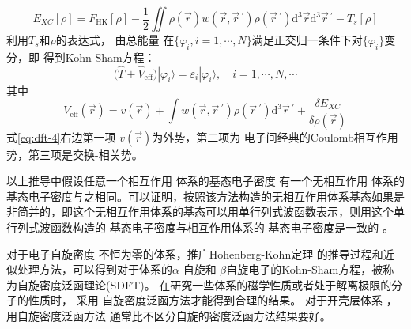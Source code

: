 \begin{equation} 
  \label{eq:dft-2}
  E_{XC}[\rho]=F_{\mathrm{HK}}[\rho]-\frac 12\iint{\rho(\vec{r}) w(\vec{r},\vec r\,^{\prime})\rho(\vec r\,^{\prime})\textrm{d}^3\vec{r}\textrm{d}^3\vec r\,^{\prime}}-T_{s}[\rho]
\end{equation}
利用$T_s$和$\rho$的表达式，%
{由}总能量%
{在$\{\varphi_i, i\!=\!1,\cdots, N\}$满足正交归一条件下对$\{\varphi_i\}$}变分，即%
得到Kohn-Sham方程：
\begin{equation} \label{eq:dft-3}
	\bigl(\hat{T}+\hat{V}_{\mathrm{eff}}\bigr)|\varphi_{i}\rangle=\varepsilon_{i}|\varphi_{i}\rangle{,\quad i=1,\cdots,N,\cdots}
\end{equation}
其中
\begin{equation} \label{eq:dft-4}
	V_{\mathrm{eff}}(\vec{r})={v}(\vec{r})+\int{w(\vec{r},\vec r\,^{\prime})\rho(\vec r\,^{\prime})\textrm{d}^3{\vec r\,^{\prime}}+\frac{\delta E_{XC}}{\delta\rho(\vec{r})
}}
\end{equation}
式\eqref{eq:dft-4}右边第一项%
${v}(\vec{r})
$为外势，第二项为%
{电}子间经典的{Coulomb}相互作用势，第三项是交换-相关势。%

以上推导中假设任意一个相互作用%
{体系的基态电}子密度%
{有一个}无相互作用%
{体系的基态电}子密度{与之相同}。可以证明，按照该方法构造的无相互作用体系基态如果是非简并的，即这个无相互作用体系的基态可以用单行列式波函数表示，则用这个单行列式波函数构造的%
{基态电}子密度与相互作用体系的%
{基态电}子密度是一致的%
。

对于{电子}自旋{密度}%
{不恒为零的体系，推广}Hohenberg-Kohn定理%
{的推导过程和近似处理方法，可以得到对于体系的}$\alpha$%
自旋和%
{$\beta$自旋}电子的{\textrm{Kohn-Sham}方程，被称为自旋密度泛函理论\textrm{(SDFT)}。}%
{在}研究一些体系的磁学性质或者处于解离极限的分子的性质{时}，%
采用%
自旋密度泛函方法才能得到合理的结果{。}%
对于开壳层体系%
，用自旋密度泛函方法%
通常比不{区}分自旋的密度泛函方法结果要好。%

